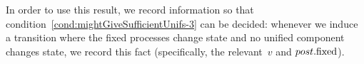 





In order to use this result, we record information so that
condition~\ref{cond:mightGiveSufficientUnifs-3} can be decided: whenever we
induce a transition where the fixed processes change state and no unified
component changes state, we record this fact (specifically, the relevant~$v$
and $post.\mathrm{fixed}$).

